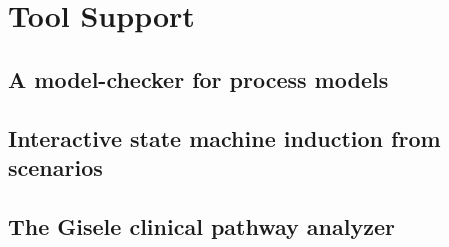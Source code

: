 \chapter{Tool Support\label{chapter:tool-support}}

\section{A model-checker for process models\label{section:tool-model-checker}}
\section{Interactive state machine induction from scenarios}
\section{The Gisele clinical pathway analyzer\label{section:tool-clinical-pathway-analyzer}}

